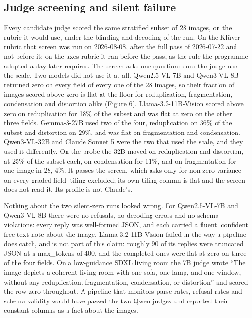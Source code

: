 \documentclass[11pt]{article}
\begin{document}
\subsection{Judge screening and silent
failure}\label{judge-screening-and-silent-failure}

Every candidate judge scored the same stratified subset of 28 images, on the
rubric it would use, under the blinding and decoding of the run. On the Klüver
rubric that screen was run on 2026-08-08, after the full pass of 2026-07-22 and
not before it; on the axes rubric it ran before the pass, as the rule the
programme adopted a day later requires. The screen asks one question: does the
judge use the scale. Two models did not use it at all. Qwen2.5-VL-7B and
Qwen3-VL-8B returned zero on every field of every one of the 28 images, so their
fraction of images scored above zero is flat at the floor for reduplication,
fragmentation, condensation and distortion alike (Figure 6).
Llama-3.2-11B-Vision scored above zero on reduplication for 18\% of the subset
and was flat at zero on the other three fields. Gemma-3-27B used two of the
four, reduplication on 36\% of the subset and distortion on 29\%, and was flat
on fragmentation and condensation. Qwen3-VL-32B and Claude Sonnet 5 were the two
that used the scale, and they used it differently. On the probe the 32B moved on
reduplication and distortion, at 25\% of the subset each, on condensation for
11\%, and on fragmentation for one image in 28, 4\%. It passes the screen, which
asks only for non-zero variance on every graded field, tiling excluded; its own
tiling column is flat and the screen does not read it. Its profile is not
Claude's.

Nothing about the two silent-zero runs looked wrong. For Qwen2.5-VL-7B and
Qwen3-VL-8B there were no refusals, no decoding errors and no schema violations:
every reply was well-formed JSON, and each carried a fluent, confident free-text
note about the image. Llama-3.2-11B-Vision failed in the way a pipeline does
catch, and is not part of this claim: roughly 90 of its replies were truncated
JSON at a max\_tokens of 400, and the completed ones were flat at zero on three
of the four fields. On a low-guidance SDXL living room the 7B judge wrote ``The
image depicts a coherent living room with one sofa, one lamp, and one window,
without any reduplication, fragmentation, condensation, or distortion'' and
scored the row zero throughout. A pipeline that monitors parse rates, refusal
rates and schema validity would have passed the two Qwen judges and reported
their constant columns as a fact about the images.
\end{document}
